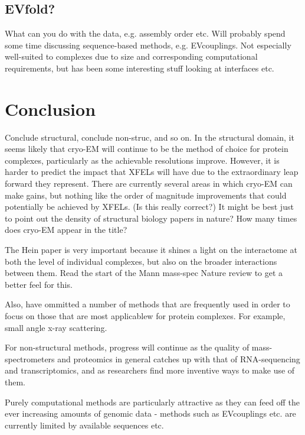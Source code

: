 \documentclass[a4paper,11pt,twoside,openright]{scrbook}
\begin{document}

\subsection{EVfold?}
What can you do with the data, e.g. assembly order etc. Will probably spend some time discussing sequence-based methods, e.g. EVcouplings. Not especially well-suited to complexes due to size and corresponding computational requirements, but has been some interesting stuff looking at interfaces etc.

\section{Conclusion}
Conclude structural, conclude non-struc, and so on. In the structural domain, it seems likely that cryo-EM will continue to be the method of choice for protein complexes, particularly as the achievable resolutions improve. However, it is harder to predict the impact that XFELs will have due to the extraordinary leap forward they represent. There are currently several areas in which cryo-EM can make gains, but nothing like the order of magnitude improvements that could potentially be achieved by XFELs. (Is this really correct?) It might be best just to point out the density of structural biology papers in nature? How many times does cryo-EM appear in the title?

The Hein paper is very important because it shines a light on the interactome at both the level of individual complexes, but also on the broader interactions between them. Read the start of the Mann mass-spec Nature review to get a better feel for this.

Also, have ommitted a number of methods that are frequently used in order to focus on those that are most applicablew for protein complexes. For example, small angle x-ray scattering.

For non-structural methods, progress will continue as the quality of mass-spectrometers and proteomics in general catches up with that of RNA-sequencing and transcriptomics, and as researchers find more inventive ways to make use of them.

Purely computational methods are particularly attractive as they can feed off the ever increasing amounts of genomic data - methods such as EVcouplings etc. are currently limited by available sequences etc.
\end{document}
